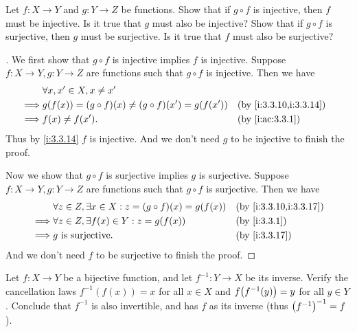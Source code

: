 \begin{ex}\label{i:ex:3.3.5}
  Let \(f : X \to Y\) and \(g : Y \to Z\) be functions.
  Show that if \(g \circ f\) is injective, then \(f\) must be injective.
  Is it true that \(g\) must also be injective?
  Show that if \(g \circ f\) is surjective, then \(g\) must be surjective.
  Is it true that \(f\) must also be surjective?
\end{ex}

\begin{proof}[]
  We first show that \(g \circ f\) is injective implies \(f\) is injective.
  Suppose \(f : X \to Y, g : Y \to Z\) are functions such that \(g \circ f\) is injective.
  Then we have
  \begin{align*}
             & \forall x, x' \in X, x \neq x'                                                       \\
    \implies & g(f(x)) = (g \circ f)(x) \neq (g \circ f)(x') = g(f(x')) &  & \by{i:3.3.10,i:3.3.14} \\
    \implies & f(x) \neq f(x').                                         &  & \by{i:ac:3.3.1}
  \end{align*}
  Thus by \cref{i:3.3.14} \(f\) is injective.
  And we don't need \(g\) to be injective to finish the proof.

  Now we show that \(g \circ f\) is surjective implies \(g\) is surjective.
  Suppose \(f : X \to Y, g : Y \to Z\) are functions such that \(g \circ f\) is surjective.
  Then we have
  \begin{align*}
             & \forall z \in Z, \exists x \in X : z = (g \circ f)(x) = g(f(x)) &  & \by{i:3.3.10,i:3.3.17} \\
    \implies & \forall z \in Z, \exists f(x) \in Y : z = g(f(x))               &  & \by{i:3.3.1}           \\
    \implies & g \text{ is surjective}.                                        &  & \by{i:3.3.17}
  \end{align*}
  And we don't need \(f\) to be surjective to finish the proof.
\end{proof}

\begin{ex}\label{i:ex:3.3.6}
  Let \(f : X \to Y\) be a bijective function, and let \(f^{-1} : Y \to X\) be its inverse.
  Verify the cancellation laws \(f^{-1}(f(x)) = x\) for all \(x \in X\) and \(f\pa{f^{-1}(y)} = y\) for all \(y \in Y\).
  Conclude that \(f^{-1}\) is also invertible, and has \(f\) as its inverse (thus \(\left\lparen f^{-1}\right\rparen^{-1} = f\)).
\end{ex}

